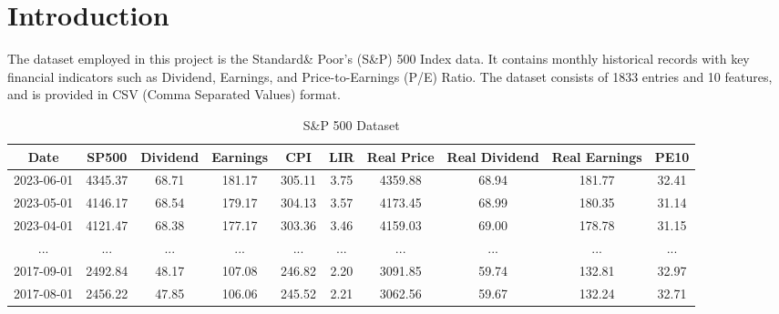 \documentclass[a4paper,12pt]{report}
\begin{document}
\section{Introduction}
The dataset employed in this project is the Standard\& Poor’s (S\&P) 500 Index data. It contains monthly historical records with key financial indicators such as Dividend, Earnings, and Price-to-Earnings (P/E) Ratio. The dataset consists of 1833 entries and 10 features, and is provided in CSV (Comma Separated Values) format.
\begin{table}[H]
\centering
\begin{adjustbox}{width=\textwidth}
\begin{tabular}{|c|c|c|c|c|c|c|c|c|c|}
\hline
\textbf{Date} & \textbf{SP500} & \textbf{Dividend} & \textbf{Earnings} & \textbf{CPI} & \textbf{LIR} & \textbf{Real Price} & \textbf{Real Dividend} & \textbf{Real Earnings} & \textbf{PE10}\\
\hline
2023-06-01 & 4345.37 & 68.71 & 181.17 & 305.11 & 3.75 & 4359.88 & 68.94 & 181.77 & 32.41 \\
2023-05-01 & 4146.17 & 68.54 & 179.17 & 304.13 & 3.57 & 4173.45 & 68.99 & 180.35 & 31.14 \\
2023-04-01 & 4121.47 & 68.38 & 177.17 & 303.36 & 3.46 & 4159.03 & 69.00 & 178.78 & 31.15 \\
...&...&...&...&...&...&...&...&...&...\\
2017-09-01 & 2492.84 & 48.17 & 107.08 & 246.82 & 2.20 & 3091.85 & 59.74 & 132.81 & 32.97 \\
2017-08-01 & 2456.22 & 47.85 & 106.06 & 245.52 & 2.21 & 3062.56 & 59.67 & 132.24 & 32.71 \\
\hline
\end{tabular}
\end{adjustbox}
\caption{S\&P 500 Dataset}
\end{table}
\end{document}
